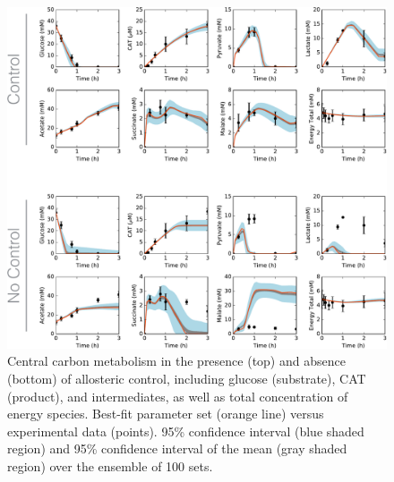 \documentclass[12pt]{article}
\begin{document}
\begin{figure}[ht]
\centering
\includegraphics[width=1.00\textwidth]{./Figures/allostericControl_noindex.pdf}
\caption{Central carbon metabolism in the presence (top) and absence (bottom) of allosteric control, including glucose (substrate), CAT (product), and intermediates, as well as total concentration of energy species. Best-fit parameter set (orange line) versus experimental data (points). 95\% confidence interval (blue shaded region) and 95\% confidence interval of the mean (gray shaded region) over the ensemble of 100 sets.}
\label{fig:CarbonBoth}
\end{figure}
\end{document}

